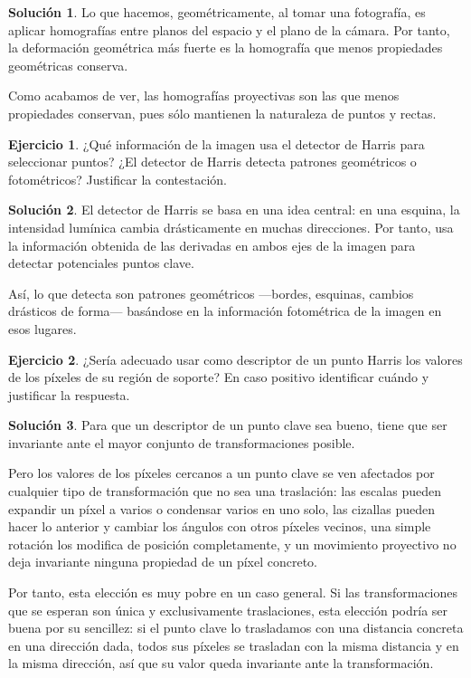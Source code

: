 \documentclass[a4paper, 11pt]{article}
\theoremstyle{definition}
\newtheorem{ejercicio}{Ejercicio}
\newtheorem*{solucion}{Solución}
\theoremstyle{theorem}
\begin{document}
  \begin{solucion}
      Lo que hacemos, geométricamente, al tomar una fotografía, es aplicar homografías entre planos del espacio y el plano de la cámara. Por tanto, la deformación geométrica más fuerte es la homografía que menos propiedades geométricas conserva.

      Como acabamos de ver, las homografías proyectivas son las que menos propiedades conservan, pues sólo mantienen la naturaleza de puntos y rectas.
  \end{solucion}

  \begin{ejercicio}
      ¿Qué información de la imagen usa el detector de Harris para seleccionar puntos? ¿El detector de Harris detecta patrones geométricos o fotométricos? Justificar la contestación.
  \end{ejercicio}

  \begin{solucion}
      El detector de Harris se basa en una idea central: en una esquina, la intensidad lumínica cambia drásticamente en muchas direcciones. Por tanto, usa la información obtenida de las derivadas en ambos ejes de la imagen para detectar potenciales puntos clave.

      Así, lo que detecta son patrones geométricos ---bordes, esquinas, cambios drásticos de forma--- basándose en la información fotométrica de la imagen en esos lugares.
  \end{solucion}

  \begin{ejercicio}
      ¿Sería adecuado usar como descriptor de un punto Harris los valores de los píxeles de su región de soporte? En caso positivo identificar cuándo y justificar la respuesta.
  \end{ejercicio}

  \begin{solucion}
      Para que un descriptor de un punto clave sea bueno, tiene que ser invariante ante el mayor conjunto de transformaciones posible.

      Pero los valores de los píxeles cercanos a un punto clave se ven afectados por cualquier tipo de transformación que no sea una traslación: las escalas pueden expandir un píxel a varios o condensar varios en uno solo, las cizallas pueden hacer lo anterior y cambiar los ángulos con otros píxeles vecinos, una simple rotación los modifica de posición completamente, y un movimiento proyectivo no deja invariante ninguna propiedad de un píxel concreto.

      Por tanto, esta elección es muy pobre en un caso general. Si las transformaciones que se esperan son única y exclusivamente traslaciones, esta elección podría ser buena por su sencillez: si el punto clave lo trasladamos con una distancia concreta en una dirección dada, todos sus píxeles se trasladan con la misma distancia y en la misma dirección, así que su valor queda invariante ante la transformación.
  \end{solucion}
\end{document}
